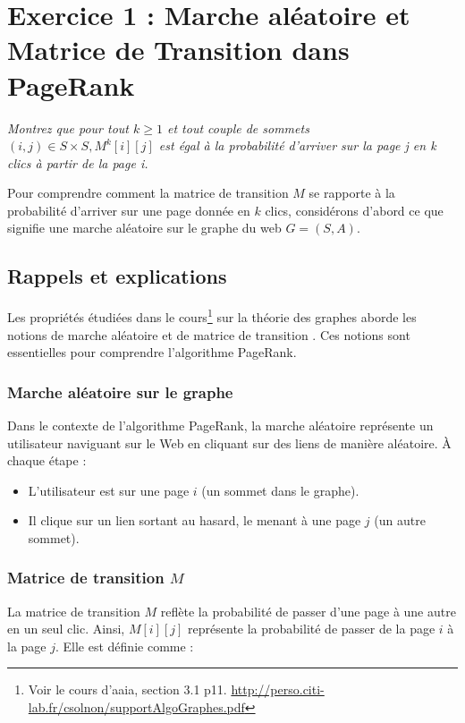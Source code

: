
\section{Exercice 1 : Marche aléatoire et Matrice de Transition dans PageRank}

\textit{Montrez que pour tout $k \geq 1$ et tout couple de sommets $(i, j) \in S \times S, M^k[i][j]$ est égal à la probabilité d'arriver sur la page j en k clics à partir de la page i.}

Pour comprendre comment la matrice de transition $M$ se rapporte à la probabilité d'arriver sur une page donnée en $k$ clics, considérons d'abord ce que signifie une marche aléatoire sur le graphe du web $G = (S, A)$.

\subsection{Rappels et explications}
Les propriétés étudiées dans le cours\footnote{Voir le cours d'\acrshort{aaia}, section 3.1 p11. \url{http://perso.citi-lab.fr/csolnon/supportAlgoGraphes.pdf}} sur la théorie des graphes aborde les notions de marche aléatoire et de matrice de transition \cite{Solnon2016coursAAIA}. Ces notions sont essentielles pour comprendre l'algorithme PageRank.

\subsubsection{Marche aléatoire sur le graphe}

Dans le contexte de l'algorithme PageRank, la marche aléatoire représente un utilisateur naviguant sur le Web en cliquant sur des liens de manière aléatoire. À chaque étape :
\begin{itemize}
    \item L'utilisateur est sur une page $i$ (un sommet dans le graphe).
    \item Il clique sur un lien sortant au hasard, le menant à une page $j$ (un autre sommet).
\end{itemize}

\subsubsection{Matrice de transition $M$}

La matrice de transition $M$ reflète la probabilité de passer d'une page à une autre en un seul clic. Ainsi, $M[i][j]$ représente la probabilité de passer de la page $i$ à la page $j$. Elle est définie comme :

